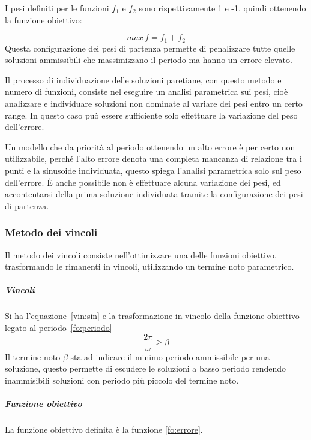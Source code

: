 \documentclass[a4paper,12pt]{report}
\begin{document}
I pesi definiti per le funzioni $ f_1 $ e $ f_2 $ sono rispettivamente 1 e -1, quindi ottenendo la funzione obiettivo:

\begin{equation}
max \, f = f_1 + f_2
\end{equation}
Questa configurazione dei pesi di partenza permette di penalizzare tutte quelle soluzioni ammissibili che massimizzano il periodo ma hanno un errore elevato.

Il processo di individuazione delle soluzioni paretiane, con questo metodo e numero di funzioni, consiste nel eseguire un analisi parametrica sui pesi, cioè analizzare e individuare soluzioni non dominate al variare dei pesi entro un certo range. In questo caso può essere sufficiente solo effettuare la variazione del peso dell'errore.

Un modello che da priorità al periodo ottenendo un alto errore è per certo non utilizzabile, perché l'alto errore denota una completa mancanza di relazione tra i punti e la sinusoide individuata, questo spiega l'analisi parametrica solo sul peso dell'errore. È anche possibile non è effettuare alcuna variazione dei pesi, ed accontentarsi della prima soluzione individuata tramite la configurazione dei pesi di partenza.

\subsubsection{Metodo dei vincoli}
Il metodo dei vincoli consiste nell'ottimizzare una delle funzioni obiettivo, trasformando le rimanenti in vincoli, utilizzando un termine noto parametrico.

\subparagraph{Vincoli} Si ha l'equazione~\eqref{vin:sin} e la trasformazione in vincolo della funzione obiettivo legato al periodo~\eqref{fo:periodo}
\begin{equation}
\label{vin:periodo}
\frac{2\pi}{\omega} \ge \beta
\end{equation}
Il termine noto $ \beta $ sta ad indicare il minimo periodo ammissibile per una soluzione, questo permette di escudere le soluzioni a basso periodo rendendo inammisibili soluzioni con periodo più piccolo del termine noto.

\subparagraph{Funzione obiettivo}
La funzione obiettivo definita è la funzione \eqref{fo:errore}.
\end{document}
